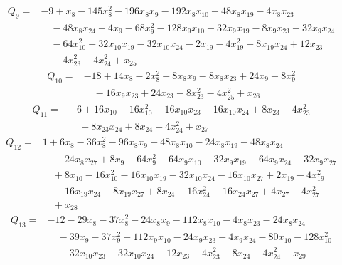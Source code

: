 \begin{equation*}\begin{split}
Q_{9}={}&-9 + x_{8} - 145x_{8}^{2} - 196x_{8} x_{9} - 192x_{8} x_{10} - 48x_{8} x_{19} - 4x_{8} x_{23}\\
&\quad -48x_{8} x_{24} + 4x_{9} - 68x_{9}^{2} - 128x_{9} x_{10} - 32x_{9} x_{19} - 8x_{9} x_{23} - 32x_{9} x_{24}\\
&\quad -64x_{10}^{2} - 32x_{10} x_{19} - 32x_{10} x_{24} - 2x_{19} - 4x_{19}^{2} - 8x_{19} x_{24} + 12x_{23}\\
&\quad -4x_{23}^{2} - 4x_{24}^{2} + x_{25}
\end{split}\end{equation*}
\begin{equation*}\begin{split}
Q_{10}={}&-18 + 14x_{8} - 2x_{8}^{2} - 8x_{8} x_{9} - 8x_{8} x_{23} + 24x_{9} - 8x_{9}^{2}\\
&\quad -16x_{9} x_{23} + 24x_{23} - 8x_{23}^{2} - 4x_{25}^{2} + x_{26}
\end{split}\end{equation*}
\begin{equation*}\begin{split}
Q_{11}={}&-6 + 16x_{10} - 16x_{10}^{2} - 16x_{10} x_{23} - 16x_{10} x_{24} + 8x_{23} - 4x_{23}^{2}\\
&\quad -8x_{23} x_{24} + 8x_{24} - 4x_{24}^{2} + x_{27}
\end{split}\end{equation*}
\begin{equation*}\begin{split}
Q_{12}={}&1 + 6x_{8} - 36x_{8}^{2} - 96x_{8} x_{9} - 48x_{8} x_{10} - 24x_{8} x_{19} - 48x_{8} x_{24}\\
&\quad -24x_{8} x_{27} + 8x_{9} - 64x_{9}^{2} - 64x_{9} x_{10} - 32x_{9} x_{19} - 64x_{9} x_{24} - 32x_{9} x_{27}\\
&\quad + 8x_{10} - 16x_{10}^{2} - 16x_{10} x_{19} - 32x_{10} x_{24} - 16x_{10} x_{27} + 2x_{19} - 4x_{19}^{2}\\
&\quad -16x_{19} x_{24} - 8x_{19} x_{27} + 8x_{24} - 16x_{24}^{2} - 16x_{24} x_{27} + 4x_{27} - 4x_{27}^{2}\\
&\quad + x_{28}
\end{split}\end{equation*}
\begin{equation*}\begin{split}
Q_{13}={}&-12 - 29x_{8} - 37x_{8}^{2} - 24x_{8} x_{9} - 112x_{8} x_{10} - 4x_{8} x_{23} - 24x_{8} x_{24}\\
&\quad -39x_{9} - 37x_{9}^{2} - 112x_{9} x_{10} - 24x_{9} x_{23} - 4x_{9} x_{24} - 80x_{10} - 128x_{10}^{2}\\
&\quad -32x_{10} x_{23} - 32x_{10} x_{24} - 12x_{23} - 4x_{23}^{2} - 8x_{24} - 4x_{24}^{2} + x_{29}
\end{split}\end{equation*}
